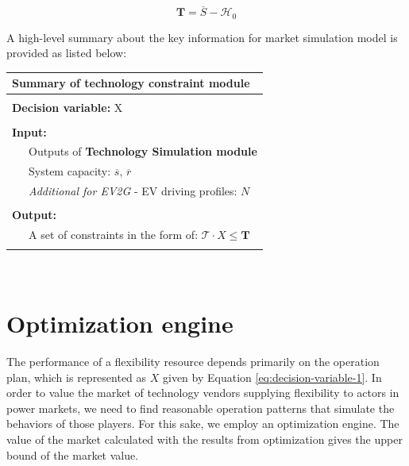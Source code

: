 \begin{equation*}
\mathbf{T} = \overline{S} - \mathcal{H}_0
\end{equation*}

A high-level summary about the key information for market simulation model is provided as listed below:

\begin{table}[h!]
	\begin{tabular}{L{0.95\textwidth}}
		\hline
		\textbf{Summary of technology constraint module} \\
		\hline
		\\
		\textbf{Decision variable:} X\\
		\\
		\textbf{Input:} \\
		~~~Outputs of \textbf{Technology Simulation module}\\
		~~~System capacity: $\overline{s}$, $\overline{r}$\\
		~~~\textit{Additional for EV2G} - EV driving profiles: $N$\\
		\\
		\textbf{Output:} \\
		~~~A set of constraints in the form of: $\mathcal{T} \cdot X \leq \mathbf{T}$ \\
		\\
		\hline
	\end{tabular}
\end{table}
~\newpage



\section{Optimization engine}
The performance of a flexibility resource depends primarily on the operation plan, which is represented as $X$ given by Equation \eqref{eq:decision-variable-1}. In order to value the market of technology vendors supplying flexibility to actors in power markets, we need to find reasonable operation patterns that simulate the behaviors of those players. For this sake, we employ an optimization engine. The value of the market calculated with the results from optimization gives the upper bound of the market value.

